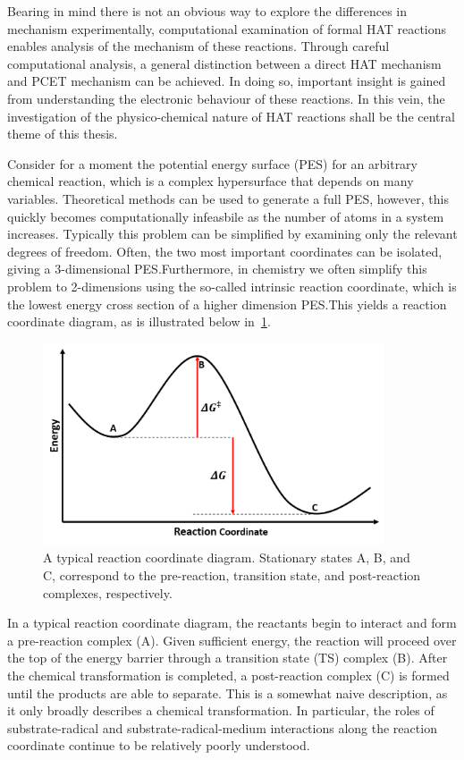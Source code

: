 Bearing in mind there is not an obvious way to explore the differences in mechanism experimentally, computational examination of formal HAT reactions enables analysis of the mechanism of these reactions. Through careful computational analysis, a general distinction between a direct HAT mechanism and PCET mechanism can be achieved. In doing so, important insight is gained from understanding the electronic behaviour of these reactions. In this vein, the investigation of the physico-chemical nature of HAT reactions shall be the central theme of this thesis.

Consider for a moment the potential energy surface (PES) for an arbitrary chemical reaction, which is a complex hypersurface that depends on many variables. Theoretical methods can be used to generate a full PES, however, this quickly becomes computationally infeasbile as the number of atoms in a system increases. Typically this problem can be simplified by examining only the relevant degrees of freedom. Often, the two most important coordinates can be isolated, giving a 3-dimensional PES.\@ Furthermore, in chemistry we often simplify this problem to 2-dimensions using the so-called intrinsic reaction coordinate, which is the lowest energy cross section of a higher dimension PES.\@ This yields a reaction coordinate diagram, as is illustrated below in~\ref{fig:pes}.

\begin{figure}[htb]
  \centering
  \includegraphics[width=0.9\textwidth]{figures/pes}
  \caption[A typical reaction coordinate diagram.]{A typical reaction coordinate diagram. Stationary states A, B, and C, correspond to the pre-reaction, transition state, and post-reaction complexes, respectively.}
\label{fig:pes}
\end{figure}

In a typical reaction coordinate diagram, the reactants begin to interact and form a pre-reaction complex (A). Given sufficient energy, the reaction will proceed over the top of the energy barrier through a transition state (TS) complex (B). After the chemical transformation is completed, a post-reaction complex (C) is formed until the products are able to separate. This is a somewhat naive description, as it only broadly describes a chemical transformation. In particular, the roles of substrate-radical and substrate-radical-medium interactions along the reaction coordinate continue to be relatively poorly understood.

